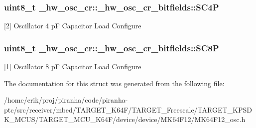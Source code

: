 \subsubsection[{\texorpdfstring{S\+C4P}{SC4P}}]{\setlength{\rightskip}{0pt plus 5cm}uint8\+\_\+t \+\_\+hw\+\_\+osc\+\_\+cr\+::\+\_\+hw\+\_\+osc\+\_\+cr\+\_\+bitfields\+::\+S\+C4P}\hypertarget{struct__hw__osc__cr_1_1__hw__osc__cr__bitfields_a7756c45924be9f067eb33148291248cf}{}\label{struct__hw__osc__cr_1_1__hw__osc__cr__bitfields_a7756c45924be9f067eb33148291248cf}
\mbox{[}2\mbox{]} Oscillator 4 pF Capacitor Load Configure 
\subsubsection[{\texorpdfstring{S\+C8P}{SC8P}}]{\setlength{\rightskip}{0pt plus 5cm}uint8\+\_\+t \+\_\+hw\+\_\+osc\+\_\+cr\+::\+\_\+hw\+\_\+osc\+\_\+cr\+\_\+bitfields\+::\+S\+C8P}\hypertarget{struct__hw__osc__cr_1_1__hw__osc__cr__bitfields_ae7f40e2862e86f935c778b8eb45e3a7b}{}\label{struct__hw__osc__cr_1_1__hw__osc__cr__bitfields_ae7f40e2862e86f935c778b8eb45e3a7b}
\mbox{[}1\mbox{]} Oscillator 8 pF Capacitor Load Configure 

The documentation for this struct was generated from the following file\+:\begin{DoxyCompactItemize}
\item 
/home/erik/proj/piranha/code/piranha-\/ptc/src/receiver/mbed/\+T\+A\+R\+G\+E\+T\+\_\+\+K64\+F/\+T\+A\+R\+G\+E\+T\+\_\+\+Freescale/\+T\+A\+R\+G\+E\+T\+\_\+\+K\+P\+S\+D\+K\+\_\+\+M\+C\+U\+S/\+T\+A\+R\+G\+E\+T\+\_\+\+M\+C\+U\+\_\+\+K64\+F/device/device/\+M\+K64\+F12/M\+K64\+F12\+\_\+osc.\+h\end{DoxyCompactItemize}

